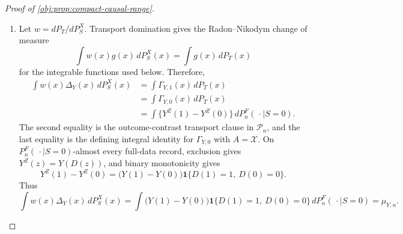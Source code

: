 \documentclass[11pt]{article}
\begin{document}
\begin{proof}[Proof of \cref{obj:prop:compact-causal-range}]
\begin{enumerate}
For the outcome contrast, apply this identity with \(F_z=Y(D(z))\), the treatment-potential outcome evaluated at the receipt induced by assignment \(z\).  Under the observation map, an assigned source record with \(Z=z\) has observed coordinates \(D=D(z)\) and \(Y=Y(D(z))\), so the left side is the observed-source score integral from \cref{obj:lem:source-observation-facts}.  The right side is
\[
\int_{\{X\in A\}}\{Y(D(1))-Y(D(0))\}\,dP_n^F(\,\cdot\mid S=1),
\]
and exclusion rewrites \(Y(D(z))\) as \(Y^Z(z)\) \(P_n^F(\,\cdot\mid S=1)\)-almost surely.  Applying the same inverse-propensity identity to the receipt functions \(F_z=\mathbf 1[D(z)=1]\), and using the observed coordinate \(D=D(Z)\), gives
\[
\int_A\Delta_Y\,dP_S^X=\int_A\Gamma_{Y,1}\,dP_S^X,
\qquad
\int_A\Delta_D\,dP_S^X=\int_A\Gamma_{D,1}\,dP_S^X
\]
for every measurable \(A\).  The source-contrast integrability hypotheses and the boundedness supplied by \cref{obj:lem:source-observation-facts} give the integrability needed to recover equality from equality of all measurable-set integrals, hence
\[
\Delta_Y=\Gamma_{Y,1}\quad P_S^X\text{-a.e.},
\qquad
\Delta_D=\Gamma_{D,1}\quad P_S^X\text{-a.e.}
\]

\item Let \(w=dP_T/dP_S^X\).  Transport domination gives the Radon--Nikodym change of measure
\[
\int w(x)g(x)\,dP_S^X(x)=\int g(x)\,dP_T(x)
\]
for the integrable functions used below.  Therefore,
\[
\begin{aligned}
\int w(x)\Delta_Y(x)\,dP_S^X(x)
&=
\int \Gamma_{Y,1}(x)\,dP_T(x)\\
&=
\int \Gamma_{Y,0}(x)\,dP_T(x)\\
&=
\int \{Y^Z(1)-Y^Z(0)\}\,dP_n^F(\,\cdot\mid S=0).
\end{aligned}
\]
The second equality is the outcome-contrast transport clause in \(\mathcal P_n\), and the last equality is the defining integral identity for \(\Gamma_{Y,0}\) with \(A=\mathcal X\).  On \(P_n^F(\,\cdot\mid S=0)\)-almost every full-data record, exclusion gives \(Y^Z(z)=Y(D(z))\), and binary monotonicity gives
\[
Y^Z(1)-Y^Z(0)
=
\bigl(Y(1)-Y(0)\bigr)
\mathbf 1\{D(1)=1,\ D(0)=0\}.
\]
Thus
\[
\int w(x)\Delta_Y(x)\,dP_S^X(x)
=
\int \bigl(Y(1)-Y(0)\bigr)
\mathbf 1\{D(1)=1,\ D(0)=0\}\,dP_n^F(\,\cdot\mid S=0)
=
\mu_{Y,n}.
\]


\end{enumerate}
\end{proof}
\end{document}

